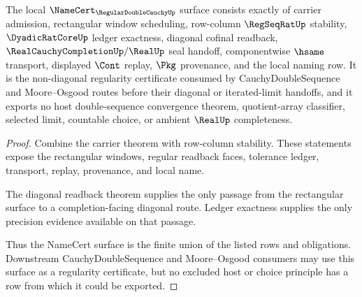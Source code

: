 \begin{theorem}
\label{thm:regular-double-cauchy-namecert-surface}
The local $\NameCert_{\RegularDoubleCauchyUp}$ surface consists exactly of carrier admission, rectangular window scheduling, row-column $\RegSeqRatUp$ stability, $\DyadicRatCoreUp$ ledger exactness, diagonal cofinal readback, $\RealCauchyCompletionUp/\RealUp$ seal handoff, componentwise $\hsame$ transport, displayed $\Cont$ replay, $\Pkg$ provenance, and the local naming row. It is the non-diagonal regularity certificate consumed by CauchyDoubleSequence and Moore--Osgood routes before their diagonal or iterated-limit handoffs, and it exports no host double-sequence convergence theorem, quotient-array classifier, selected limit, countable choice, or ambient $\RealUp$ completeness.
\end{theorem}
\begin{proof}
Combine the carrier theorem with row-column stability. These statements expose the rectangular windows, regular readback faces, tolerance ledger, transport, replay, provenance, and local name.

The diagonal readback theorem supplies the only passage from the rectangular surface to a completion-facing diagonal route. Ledger exactness supplies the only precision evidence available on that passage.

Thus the NameCert surface is the finite union of the listed rows and obligations. Downstream CauchyDoubleSequence and Moore--Osgood consumers may use this surface as a regularity certificate, but no excluded host or choice principle has a row from which it could be exported.
\end{proof}

